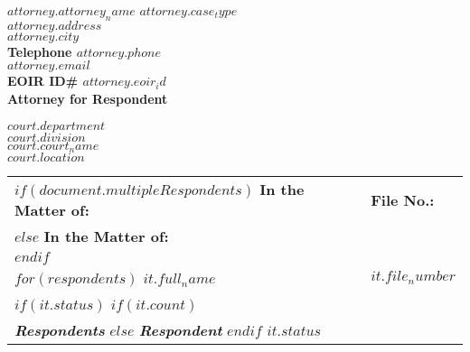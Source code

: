 \documentclass[12pt]{letter}
\date{}
\begin{document}
\begin{letter}{}
  \begin{flushleft}
    \textbf{$attorney.attorney_name$} \hfill \textbf{$attorney.case_type$} \\
    \textbf{$attorney.address$} \\
    \textbf{$attorney.city$} \\
    \textbf{Telephone $attorney.phone$} \\
    \textbf{$attorney.email$} \\
    \textbf{EOIR ID\# $attorney.eoir_id$} \\
    \textbf{Attorney for Respondent}
  \end{flushleft}
  
  \vspace{2em}
  
  \begin{center}
    \textbf{$court.department$} \\
    \textbf{$court.division$} \\
    \textbf{$court.court_name$} \\
    \textbf{$court.location$}
  \end{center}
  
  \vspace{2em}
   
\makebox[0.5\textwidth]{\hrulefill}
\begin{flushleft}
    \begin{tabular}{ p{} | p{} }


      $if(document.multipleRespondents)$
        \textbf{In the Matter of:} & \textbf{\hspace{1em}File No.:} \\
      $else$
        \textbf{In the Matter of:} \\
      $endif$ 

      \vspace{.0em} & \\ 

      $for(respondents)$
        \textbf{$it.full_name$} & \textbf{\hspace{1em}$it.file_number$} \\
        $if(it.status)$ 
          $if(it.count)$ 
            \vspace{.0em} & \\ 
            \textit{\textbf{Respondents}}
          $else$
            \textit{\textbf{Respondent}} 
          $endif$ 
          \textbf{$it.status$}


\end{tabular}
\end{flushleft}
\end{letter}
\end{document}
